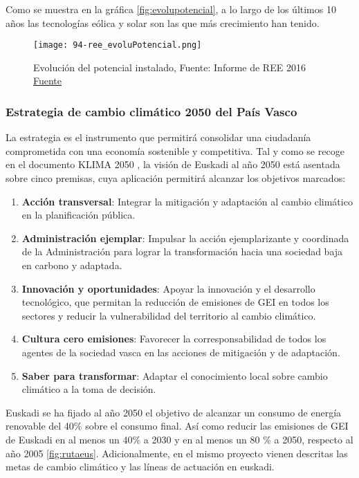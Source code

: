 Como se muestra en la gráfica \autoref{fig:evolupotencial}, a lo largo de los últimos 10
años las tecnologías eólica y solar son las que más crecimiento han
tenido.

\begin{figure}
\centering
\texttt{[image: 94-ree\_evoluPotencial.png]}
\caption[Evolución del potencial instalado]{Evolución del potencial instalado, Fuente: Informe de REE 2016 \href{http://www.ree.es/es/estadisticas-del-sistema-electrico-espanol/informe-de-energias-renovables}{Fuente}}
\label{fig:evolupotencial}
\end{figure}

\subsubsection{Estrategia de cambio climático 2050 del País
Vasco}\label{header-n177}

La estrategia es el instrumento que permitirá consolidar una ciudadanía
comprometida con una economía sostenible y competitiva. Tal y como se
recoge en el documento KLIMA
2050 \cite{klima}, la visión de Euskadi al año 2050 está asentada sobre cinco
premisas, cuya aplicación permitirá alcanzar los objetivos marcados:

\begin{enumerate}
\def\labelenumi{\arabic{enumi}.}
\item
  \textbf{Acción transversal}: Integrar la mitigación y adaptación al
  cambio climático en la planificación pública.
\item
  \textbf{Administración ejemplar}: Impulsar la acción ejemplarizante y
  coordinada de la Administración para lograr la transformación hacia
  una sociedad baja en carbono y adaptada.
\item
  \textbf{Innovación y oportunidades}: Apoyar la innovación y el
  desarrollo tecnológico, que permitan la reducción de emisiones de GEI
  en todos los sectores y reducir la vulnerabilidad del territorio al
  cambio climático.
\item
  \textbf{Cultura cero emisiones}: Favorecer la corresponsabilidad de
  todos los agentes de la sociedad vasca en las acciones de mitigación y
  de adaptación.
\item
  \textbf{Saber para transformar}: Adaptar el conocimiento local sobre
  cambio climático a la toma de decisión.
\end{enumerate}

Euskadi se ha fijado al año 2050 el objetivo de alcanzar un consumo de
energía renovable del 40\% sobre el consumo final. Así como reducir las
emisiones de GEI de Euskadi en al menos un 40\% a 2030 y en al menos un
80 \% a 2050, respecto al año 2005 \autoref{fig:rutaeus}. Adicionalmente, en el mismo proyecto
vienen descritas las metas de cambio climático y las líneas de actuación
en euskadi.

